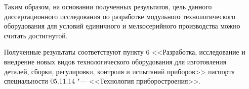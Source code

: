 Таким образом, на основании полученных результатов, цель данного диссертационного исследования по разработке модульного технологического оборудования для условий единичного и мелкосерийного производства можно считать достигнутой.

Полученные результаты соответствуют пункту 6 <<Разработка, исследование и внедрение новых видов технологического оборудования для изготовления деталей, сборки, регулировки, контроля и испытаний приборов>> паспорта специальности 05.11.14 "--- <<Технология приборостроения>>.

